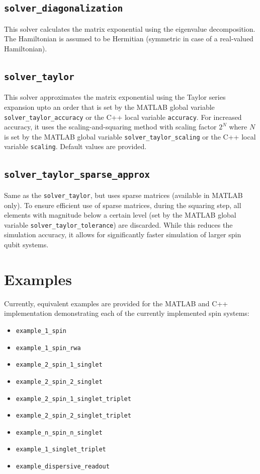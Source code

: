 \documentclass[10pt,a4paper,onecolumn,notitlepage]{article}
\begin{document}
\subsection{\lstinline{solver_diagonalization}}
This solver calculates the matrix exponential using the eigenvalue decomposition. The Hamiltonian is assumed to be Hermitian (symmetric in case of a real-valued Hamiltonian).

\subsection{\lstinline{solver_taylor}}
This solver approximates the matrix exponential using the Taylor series expansion upto an order that is set by the MATLAB global variable \lstinline{solver_taylor_accuracy} or the C++ local variable \lstinline{accuracy}. For increased accuracy, it uses the scaling-and-squaring method with scaling factor $2^N$ where $N$ is set by the MATLAB global variable \lstinline{solver_taylor_scaling} or the C++ local variable \lstinline{scaling}. Default values are provided.

\subsection{\lstinline{solver_taylor_sparse_approx}}
Same as the \lstinline{solver_taylor}, but uses sparse matrices (available in MATLAB only). To ensure efficient use of sparse matrices, during the squaring step, all elements with magnitude below a certain level (set by the MATLAB global variable \lstinline{solver_taylor_tolerance}) are discarded. While this reduces the simulation accuracy, it allows for significantly faster simulation of larger spin qubit systems.

\section{Examples}
Currently, equivalent examples are provided for the MATLAB and C++ implementation demonstrating each of the currently implemented spin systems:
\begin{itemize}
	\item \lstinline{example_1_spin}
	\item \lstinline{example_1_spin_rwa}
	\item \lstinline{example_2_spin_1_singlet}
	\item \lstinline{example_2_spin_2_singlet}
	\item \lstinline{example_2_spin_1_singlet_triplet}
	\item \lstinline{example_2_spin_2_singlet_triplet}
	\item \lstinline{example_n_spin_n_singlet}
	\item \lstinline{example_1_singlet_triplet}
	\item \lstinline{example_dispersive_readout}
\end{itemize}
\end{document}
